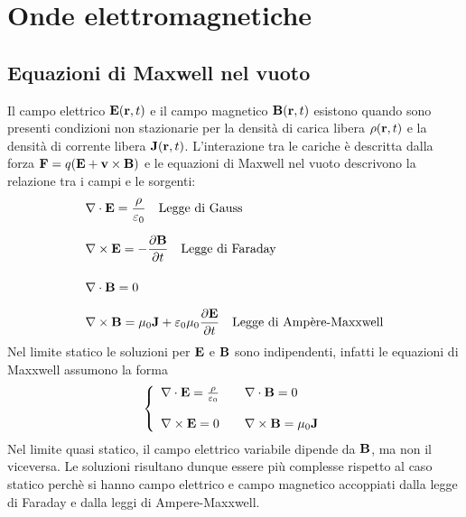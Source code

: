 \setcounter{chapter}{5}
\chapter{Onde elettromagnetiche}

\section{Equazioni di Maxwell nel vuoto}

Il campo elettrico $\bold{E}(\bold{r},t) $ e il campo magnetico $\bold{B}(\bold{r},t)$ esistono quando sono presenti condizioni non stazionarie per la densit\`a di carica libera  $\rho(\bold{r},t)$ e la densit\`a di corrente libera $\bold{J}(\bold{r},t)$. L'interazione tra le cariche \`e descritta dalla forza $\bold{F} = q(\bold{E} + \bold{v} \times \bold{B})$ e le equazioni di Maxwell nel vuoto descrivono la relazione tra i campi  e le sorgenti:
\begin{align}
	& \nabla \cdot \bold{E} = \frac{\rho}{\varepsilon_0} \quad \text{Legge di Gauss} \\ \rule{0pt}{20pt}
	&\nabla \times \bold{E} = - \frac{\partial \bold{B}}{\partial t} \quad \text{Legge di Faraday} \\ \rule{0pt}{20pt}
	& \nabla \cdot \bold{B} = 0 \\ \rule{0pt}{20pt}
	& \nabla \times \bold{B} = \mu_0 \bold{J} + \varepsilon_0 \mu_0 \frac{\partial \bold{E}}{\partial t} \quad \text{Legge di Amp\`ere-Maxxwell}
\end{align}
Nel limite statico le soluzioni per $\bold{E}$ e $\bold{B}$ sono indipendenti, infatti le equazioni di Maxxwell assumono la forma 
\begin{equation*}
\left \{ \begin{array}{l}
	 \nabla \cdot \bold{E} = \frac{\rho}{\varepsilon_0}  \quad \quad  \nabla \cdot \bold{B} = 0 \\ \rule{0pt}{20pt}
	 \nabla \times \bold{E} = 0 \quad \quad  \nabla \times \bold{B} = \mu_0 \bold{J}\\ 
	\end{array}\right.
\end{equation*}
Nel limite quasi statico, il campo elettrico variabile dipende da $\bold{B}$, ma non il viceversa. Le soluzioni risultano dunque essere pi\`u complesse rispetto al caso statico perch\`e si hanno campo elettrico e campo magnetico accoppiati dalla legge di Faraday e dalla leggi di Ampere-Maxxwell.

